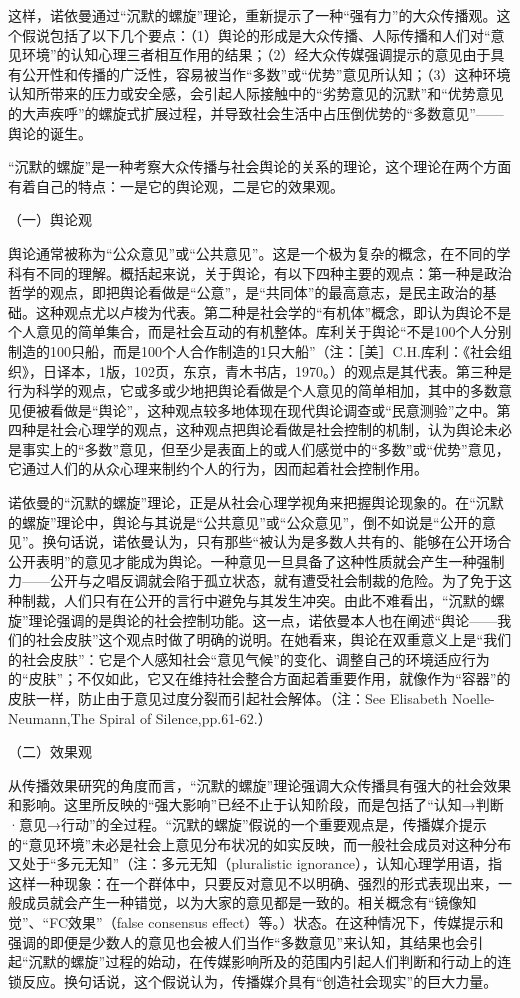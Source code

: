 \documentclass[UTF8,12pt]{ctexart}
\numberwithin{equation}{section} %
\numberwithin{figure}{section}
\numberwithin{table}{section}
\begin{document}
	这样，诺依曼通过“沉默的螺旋”理论，重新提示了一种“强有力”的大众传播观。这个假说包括了以下几个要点：（1）舆论的形成是大众传播、人际传播和人们对“意见环境”的认知心理三者相互作用的结果；（2）经大众传媒强调提示的意见由于具有公开性和传播的广泛性，容易被当作“多数”或“优势”意见所认知；（3）这种环境认知所带来的压力或安全感，会引起人际接触中的“劣势意见的沉默”和“优势意见的大声疾呼”的螺旋式扩展过程，并导致社会生活中占压倒优势的“多数意见”——舆论的诞生。
	
	“沉默的螺旋”是一种考察大众传播与社会舆论的关系的理论，这个理论在两个方面有着自己的特点：一是它的舆论观，二是它的效果观。
	
	（一）舆论观
	
	舆论通常被称为“公众意见”或“公共意见”。这是一个极为复杂的概念，在不同的学科有不同的理解。概括起来说，关于舆论，有以下四种主要的观点：第一种是政治哲学的观点，即把舆论看做是“公意”，是“共同体”的最高意志，是民主政治的基础。这种观点尤以卢梭为代表。第二种是社会学的“有机体”概念，即认为舆论不是个人意见的简单集合，而是社会互动的有机整体。库利关于舆论“不是100个人分别制造的100只船，而是100个人合作制造的1只大船”（注：［美］C.H.库利：《社会组织》，日译本，1版，102页，东京，青木书店，1970。）的观点是其代表。第三种是行为科学的观点，它或多或少地把舆论看做是个人意见的简单相加，其中的多数意见便被看做是“舆论”，这种观点较多地体现在现代舆论调查或“民意测验”之中。第四种是社会心理学的观点，这种观点把舆论看做是社会控制的机制，认为舆论未必是事实上的“多数”意见，但至少是表面上的或人们感觉中的“多数”或“优势”意见，它通过人们的从众心理来制约个人的行为，因而起着社会控制作用。
	
	诺依曼的“沉默的螺旋”理论，正是从社会心理学视角来把握舆论现象的。在“沉默的螺旋”理论中，舆论与其说是“公共意见”或“公众意见”，倒不如说是“公开的意见”。换句话说，诺依曼认为，只有那些“被认为是多数人共有的、能够在公开场合公开表明”的意见才能成为舆论。一种意见一旦具备了这种性质就会产生一种强制力——公开与之唱反调就会陷于孤立状态，就有遭受社会制裁的危险。为了免于这种制裁，人们只有在公开的言行中避免与其发生冲突。由此不难看出，“沉默的螺旋”理论强调的是舆论的社会控制功能。这一点，诺依曼本人也在阐述“舆论——我们的社会皮肤”这个观点时做了明确的说明。在她看来，舆论在双重意义上是“我们的社会皮肤”：它是个人感知社会“意见气候”的变化、调整自己的环境适应行为的“皮肤”；不仅如此，它又在维持社会整合方面起着重要作用，就像作为“容器”的皮肤一样，防止由于意见过度分裂而引起社会解体。（注：See Elisabeth Noelle-Neumann,The Spiral of Silence,pp.61-62.）
	
	（二）效果观
	
	从传播效果研究的角度而言，“沉默的螺旋”理论强调大众传播具有强大的社会效果和影响。这里所反映的“强大影响”已经不止于认知阶段，而是包括了“认知→判断·意见→行动”的全过程。“沉默的螺旋”假说的一个重要观点是，传播媒介提示的“意见环境”未必是社会上意见分布状况的如实反映，而一般社会成员对这种分布又处于“多元无知”（注：多元无知（pluralistic ignorance），认知心理学用语，指这样一种现象：在一个群体中，只要反对意见不以明确、强烈的形式表现出来，一般成员就会产生一种错觉，以为大家的意见都是一致的。相关概念有“镜像知觉”、“FC效果”（false consensus effect）等。）状态。在这种情况下，传媒提示和强调的即便是少数人的意见也会被人们当作“多数意见”来认知，其结果也会引起“沉默的螺旋”过程的始动，在传媒影响所及的范围内引起人们判断和行动上的连锁反应。换句话说，这个假说认为，传播媒介具有“创造社会现实”的巨大力量。
	
\end{document}
